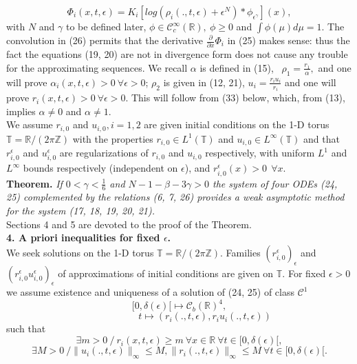 \documentclass[a4paper,12pt]{article}
\begin{document}
\begin{equation}\Phi_i(x,t,\epsilon)=K_i[log(\rho_i(.,t,\epsilon)+\epsilon^N)*\phi_{\epsilon^\gamma}](x),
\end{equation} with $N$ and $\gamma$ to be defined later, $\phi\in \mathcal{C}_c^\infty(\mathbb{R}), \ \phi\geq 0$ and  $ \int\phi(\mu)d\mu=1$. The convolution in (26) permits that the derivative $\frac{\partial}{\partial x}\Phi_i$ in (25) makes sense: thus the fact the equations (19, 20) are not in divergence form does not cause any trouble for the approximating sequences.
We recall $\alpha$ is defined in (15), \ $\rho_1=\frac{r_1}{\alpha},$ and one will prove $\alpha_i(x,t,\epsilon)>0 \ \forall \epsilon>0$; 
$\rho_2$ is given in (12, 21), $u_i=\frac{r_iu_i}{r_i}$ and one will prove $
r_i(x,t,\epsilon)>0 \ \forall \epsilon>0$. This will follow from (33) below, which, from (13),  implies $\alpha\not=0$ and $\alpha\not=1$.\\

  We assume $r_{i,0}$ and $u_{i,0}, i=1,2$ are given initial conditions on the 1-D torus $\mathbb{T}=\mathbb{R}/(2\pi \mathbb{Z})$  with the properties $r_{i,0} \in L^1(\mathbb{T})$ and  $u_{i,0}\in   L^\infty(\mathbb{T})$ and that $r_{i,0}^\epsilon$ and $ u_{i,0}^\epsilon$ are regularizations of $r_{i,0}$ and $u_{i,0}$ respectively, with  uniform $L^1$ and $L^\infty$ bounds respectively (independent on $\epsilon$), and $r_{i,0}^\epsilon (x)>0 \  \  \forall x$.\\  
  
\textbf{Theorem.}  \textit{If $0<\gamma<\frac{1}{6}$ and $N-1-\beta-3\gamma>0$ the system of four ODEs (24, 25) complemented by the relations (6, 7,  26) provides a weak asymptotic method for the system (17, 18, 19, 20, 21).}\\


 Sections 4 and 5 are devoted to the proof of the Theorem.\\

\textbf{4. A priori inequalities for fixed $\epsilon$.} \\
We  seek solutions  on the 1-D torus $\mathbb{T}=\mathbb{R}/(2\pi \mathbb{Z})$. Families  $(r_{i,0}^\epsilon)_\epsilon$ and  $ (r_{i,0}^\epsilon u_{i,0}^\epsilon)_\epsilon$ of approximations of  initial conditions are given on $\mathbb{T}$. For fixed $\epsilon>0$ we assume existence and uniqueness of a solution of (24, 25) of class $\mathcal{C}^1$  $$[0,\delta(\epsilon)[\longmapsto \mathcal{C}_b(\mathbb{R})^4,$$
$$ \ \ \ \ \ \ \ \   \ \ \ \ \ \ \ \  \ \ \ \ \ \ \ \ t\longmapsto (r_i(.,t,\epsilon),  r_iu_i(.,t,\epsilon))$$
such that
\begin{equation}\exists m>0 \ / \ r_i(x,t,\epsilon)\geq m \ \forall x\in \mathbb{R} \ \forall t\in [0,\delta(\epsilon)[,\end{equation}
\begin{equation}\exists M>0 \ / \| u_i(.,t,\epsilon)\|_\infty\leq M, \| r_i(.,t,\epsilon)\|_\infty\leq M  \ \forall t\in [0,\delta(\epsilon)[.\end{equation}
\\
\end{document}
